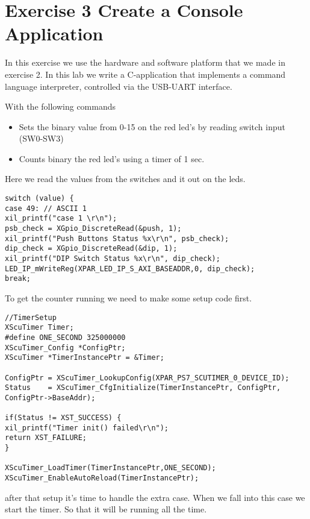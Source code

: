 \section{Exercise 3 Create a Console Application}
In this exercise we use the hardware and software platform that we made in exercise 2. In this lab we write a C-application that implements a command language interpreter, controlled via the USB-UART interface.

With the following commands

\begin{itemize}
	\item Sets the binary value from 0-15 on the red led’s by reading switch input (SW0-SW3) 
	\item Counts binary the red led’s using a timer of 1 sec. 
\end{itemize}

Here we read the values from the switches and it out on the leds.

\begin{lstlisting}[style=customc++, caption= read switchs and set value on leds,
label={lst:masterslaveadaptersource}]
	   switch (value) {
case 49: // ASCII 1
xil_printf("case 1 \r\n");
psb_check = XGpio_DiscreteRead(&push, 1);
xil_printf("Push Buttons Status %x\r\n", psb_check);
dip_check = XGpio_DiscreteRead(&dip, 1);
xil_printf("DIP Switch Status %x\r\n", dip_check);
LED_IP_mWriteReg(XPAR_LED_IP_S_AXI_BASEADDR,0, dip_check);
break;
\end{lstlisting}

To get the counter running we need to make some setup code first.

\begin{lstlisting}[style=customc++, caption= setup timer,
label={lst:masterslaveadaptersource}]
   //TimerSetup
XScuTimer Timer;
#define ONE_SECOND 325000000
XScuTimer_Config *ConfigPtr;
XScuTimer *TimerInstancePtr = &Timer;

ConfigPtr = XScuTimer_LookupConfig(XPAR_PS7_SCUTIMER_0_DEVICE_ID);
Status    = XScuTimer_CfgInitialize(TimerInstancePtr, ConfigPtr, ConfigPtr->BaseAddr);

if(Status != XST_SUCCESS) {
xil_printf("Timer init() failed\r\n");
return XST_FAILURE;
}

XScuTimer_LoadTimer(TimerInstancePtr,ONE_SECOND);
XScuTimer_EnableAutoReload(TimerInstancePtr);
\end{lstlisting}

\pagebreak
after that setup it's time to handle the extra case. When we fall into this case we start the timer. So that it will be running all the time.

